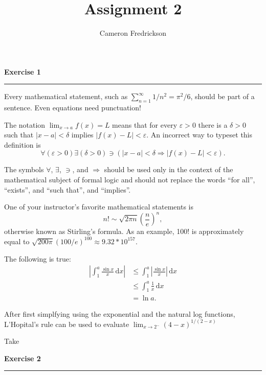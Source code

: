 \documentclass{article}
\title{Assignment 2}
\author{Cameron Fredrickson}
\date{}
\newcommand{\ud}{\, \mathrm{d}}
\begin{document}
\maketitle

\noindent \textbf{Exercise 1}

\noindent \rule{\textwidth}{.1mm}

Every mathematical statement, such as $ \sum_{n=1}^\infty 1/n^2 = \pi^2/6$, should be part of a sentence. Even equations need punctuation!

The notation $ \lim_{x \to a} f(x) = L$ means that for every $ \varepsilon > 0$ there is a $ \delta > 0$ such that $|x-a| < \delta$ implies $|f(x)-L| < \varepsilon$. An incorrect way to typeset this definition is \begin{equation*}
\forall \left( \varepsilon > 0 \right) \exists \left( \delta > 0 \right) \ni \left( |x-a| < \delta \Longrightarrow |f(x)-L| < \varepsilon \right).
\end{equation*}

The symbols $\forall$, $\exists$, $\ni$, and $\Longrightarrow$ should be used only in the context of the mathematical subject of formal logic and should not replace the words ``for all'', ``exists'', and ``such that'', and ``implies''.

One of your instructor's favorite mathematical statements is \begin{equation*}
n! \sim \sqrt{2 \pi n} \left( \frac{n}{e} \right)^{n},
\end{equation*} otherwise known as Stirling's formula. As an example,   100! is approximately equal to $ \sqrt{200 \pi} \left( 100/e \right)^{100} \approx 9.32 * 10^{157}.$

The following is true: \begin{align*}
\left| \int_1^a \frac{\sin x}{x} \ud x\right| &\leq \int_1^a \left|\frac{\sin x}{x}\right| \ud x \\
&\leq \int_1^a \frac{1}{x} \ud x \\
&= \ln a.
\end{align*}

After first simplfying using the exponential and the natural log functions, L'Hopital's rule can be used to evaluate $ \lim_{x \to 2^-} (4-x)^{1/(2-x)}$%

Take

\noindent \textbf{Exercise 2}

\noindent \rule{\textwidth}{.1mm}
\end{document}
